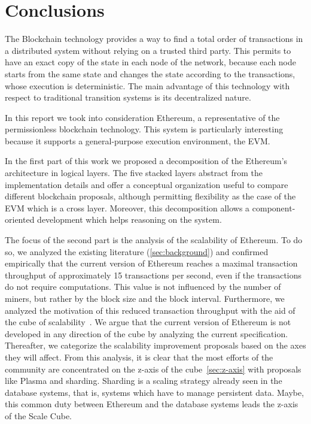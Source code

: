 \section{Conclusions}
\label{sec:conclusions}
The Blockchain technology provides a way to find a total order of transactions
in a distributed system without relying on a trusted third party. This permits
to have an exact copy of the state in each node of the network, because each
node starts from the same state and changes the state according to the
transactions, whose execution is deterministic. The main advantage of this
technology with respect to traditional transition systems is its decentralized
nature.

In this report we took into consideration Ethereum, a representative of the
permissionless blockchain technology. This system is particularly interesting
because it supports a general-purpose execution environment, the EVM.

In the first part of this work we proposed a decomposition of the Ethereum's
architecture in logical layers. The five stacked layers abstract from the
implementation details and offer a conceptual organization useful to compare
different blockchain proposals, although permitting flexibility as the case of
the EVM which is a cross layer. Moreover, this decomposition allows a
component-oriented development which helps reasoning on the system.

The focus of the second part is the analysis of the scalability of Ethereum. To
do so, we analyzed the existing literature (\autoref{sec:background}) and
confirmed empirically that the current version of Ethereum reaches a maximal
transaction throughput of approximately 15 transactions per second, even if the
transactions do not require computations. This value is not influenced by the
number of miners, but rather by the block size and the block interval.
Furthermore, we analyzed the motivation of this reduced transaction throughput
with the aid of the cube of scalability~\cite{bib:art-of-scalability}. We argue
that the current version of Ethereum is not developed in any direction of the
cube by analyzing the current specification. Thereafter, we categorize the
scalability improvement proposals based on the axes they will affect. From this
analysis, it is clear that the most efforts of the community are concentrated on
the z-axis of the cube~\autoref{sec:z-axis} with proposals like Plasma and
sharding. Sharding is a scaling strategy already seen in the database systems,
that is, systems which have to manage persistent data. Maybe, this common duty
between Ethereum and the database systems leads the z-axis of the Scale Cube.
